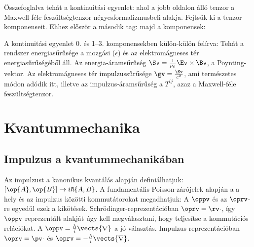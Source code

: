    Összefoglalva tehát a kontinuitási egyenlet: 
   ahol a jobb oldalon álló tenzor a Maxwell-féle feszültségtenzor négyesformalizmusbeli alakja.
   Fejtsük ki a tenzor komponenseit.
   Ehhez  először a második tag:
   majd a komponensek:
   
   A kontinuitási egyenlet 0. és 1--3. komponensekben külön-külön felírva:
   Tehát a rendszer energiasűrűsége a mozgási ($\epsilon$) és az elektromágneses tér energiasűrűségéből áll.
   Az energia-áramsűrűség $\Sv=\frac{1}{\mu_0}\Ev\times\Bv$, a Poynting-vektor.
   Az elektromágneses tér impulzussűrűsége $\gv=\frac{\Sv}{c^2}$, ami természetes módon adódik itt, illetve az impulzus-áramsűrűség a $T^{ij}$, azaz a Maxwell-féle feszültségtenzor.
   
 \section{Kvantummechanika}
  
  \subsection{Impulzus a kvantummechanikában}
   
   Az impulzust a kanonikus kvantálás alapján definiálhatjuk: $[\op{A},\op{B}]\to i\hbar\{A,B\}$.
   A fundamentális Poisson-zárójelek alapján a a hely és az impulzus közötti kommutátorokat megadhatjuk:
   A $\oppv$ és az $\oprv$-re egyedül ezek a kikötések.
   Schrödinger-reprezentációban $\oprv=\rv\cdot$, így $\oppv$ reprezentált alakját úgy kell megválasztani, hogy teljesítse a kommutációs relációkat.
   A $\oppv=\frac{\hbar}{i}\vects{\nabla}$ a jó választás.
   Impulzus reprezentációban $\oprv=\pv\cdot$ és $\oprv=-\frac{\hbar}{i}\vects{\nabla}$. 
   
